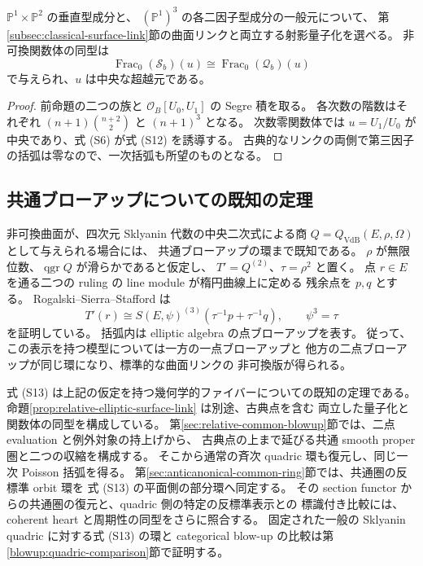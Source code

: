 \begin{corollary}\label{cor:threefold-elliptic-surface-link}
$\mathbb P^1\times\mathbb P^2$ の垂直型成分と、
$(\mathbb P^1)^3$ の各二因子型成分の一般元について、
第\ref{subsec:classical-surface-link}節の曲面リンクと両立する射影量子化を選べる。
非可換関数体の同型は
\[
 \operatorname{Frac}_0(\mathcal S_b)(u)
 \cong \operatorname{Frac}_0(\mathcal Q_b)(u)
 \tag{S12}
\]
で与えられ、$u$ は中央な超越元である。
\end{corollary}

\begin{proof}
前命題の二つの族と $\mathcal O_B[U_0,U_1]$ の Segre 積を取る。
各次数の階数はそれぞれ $(n+1)\binom{n+2}{2}$ と $(n+1)^3$ となる。
次数零関数体では $u=U_1/U_0$ が中央であり、式 (S6) が式 (S12) を誘導する。
古典的なリンクの両側で第三因子の括弧は零なので、一次括弧も所望のものとなる。
\end{proof}

\subsection{共通ブローアップについての既知の定理}

非可換曲面が、四次元 Sklyanin 代数の中央二次式による商
$Q=Q_{\mathrm{VdB}}(E,\rho,\Omega)$ として与えられる場合には、
共通ブローアップの環まで既知である。
$\rho$ が無限位数、$\operatorname{qgr}Q$ が滑らかであると仮定し、
$T'=Q^{(2)}$、$\tau=\rho^2$ と置く。
点 $r\in E$ を通る二つの ruling の line module が楕円曲線上に定める
残余点を $p,q$ とする。
Rogalski--Sierra--Stafford \cite[Basic Facts 7.2、定理7.3]{RSS2023} は
\[
 T'(r)\cong S(E,\psi)^{(3)}(\tau^{-1}p+\tau^{-1}q),
 \qquad \psi^3=\tau
 \tag{S13}
\]
を証明している。
括弧内は elliptic algebra の点ブローアップを表す。
従って、この表示を持つ模型については一方の一点ブローアップと
他方の二点ブローアップが同じ環になり、標準的な曲面リンクの
非可換版が得られる。

式 (S13) は上記の仮定を持つ幾何学的ファイバーについての既知の定理である。
命題\ref{prop:relative-elliptic-surface-link} は別途、古典点を含む
両立した量子化と関数体の同型を構成している。
第\ref{sec:relative-common-blowup}節では、二点 evaluation と例外対象の持上げから、
古典点の上まで延びる共通 smooth proper 圏と二つの収縮を構成する。
そこから通常の斉次 quadric 環も復元し、同じ一次 Poisson 括弧を得る。
第\ref{sec:anticanonical-common-ring}節では、共通圏の反標準 orbit 環を
式 (S13) の平面側の部分環へ同定する。
その section functor からの共通圏の復元と、quadric 側の特定の反標準表示との
標識付き比較には、coherent heart と周期性の同型をさらに照合する。
固定された一般の Sklyanin quadric に対する式 (S13) の環と
categorical blow-up の比較は第\ref{blowup:quadric-comparison}節で証明する。

